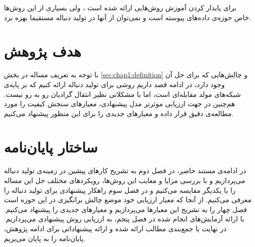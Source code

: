  برای پایدار کردن آموزش روش‌هایی ارائه شده است
 \cite{Arjovsky17Wasserstein, Gulrajaniy17ImprovedWasserstein, Mescheder17TheNumericOfGan, Roth18StabilizeGAN, Luke16UnrolledGAN,Salimans16ImprovedTechTrainingGAN}،
 ولی بسیاری از این روش‌ها خاص حوزه‌ی داده‌های پیوسته است و نمی‌توان از آنها در تولید دنباله مستقیما بهره برد.
\section{هدف پژوهش}
با توجه به تعریف مساله در بخش 
\ref{sec:chap1:definition}
و چالش‌هایی که برای حل آن وجود دارد، در ادامه قصد داریم روشی برای تولید دنباله ارائه کنیم که بر پایه‌ی شبکه‌های مولد مقابله‌ای است، اما با مشکلاتی نظیر انتقال گرادیان رو به رو نیست. هم‌چنین در جهت ارزیابی موثرتر مدل پیشنهادی، معیارهای سنجش کیفیت را مورد مطالعه‌ی دقیق قرار داده و معیارهای جدیدی را برای این منظور پیشنهاد می‌کنیم.

\section{ساختار پایان‌نامه}
در ادامه‌ی مستند حاضر، در فصل دوم به تشریح کار‌های پیشین در زمینه‌ی تولید دنباله می‌پردازیم و با بررسی مزایا و معایب این روش‌ها، رویکردهای مختلف حل این مساله را با یکدیگر مقایسه می‌کنیم و در فصل سوم راهکار پیشنهادی برای تولید دنباله را معرفی می‌کنیم.
از آنجا که معیار ارزیابی خود موضع چالش برانگیزی در این حوزه است فصل چهار را به تشریح این معیارها می‌پردازیم و معیارهای جدیدی را پیشنهاد می‌کنیم. با ارائه آزمایش‌های انجام شده در فصل پنجم، به ارزیابی روش پیشنهادی می‌پردازیم. در نهایت با جمع‌بندی مطالب ارائه شده و ارائه پیشنهاداتی برای ادامه پژوهش، پایان‌نامه را به پایان می‌بریم.



